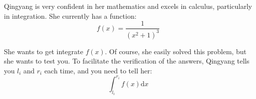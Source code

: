 Qingyang is very confident in her mathematics and excels in calculus, particularly in integration. She currently has a function:
$$
f(x)=\frac{1}{(x^2+1)^3}
$$

She wants to get integrate $f(x)$. Of course, she easily solved this problem, but she wants to test you. To facilitate the verification of the answers, Qingyang tells you $l_i$ and $r_i$ each time, and you need to tell her:
$$
\int_{l_i}^{r_i}f(x) \mathrm{d}x
$$
